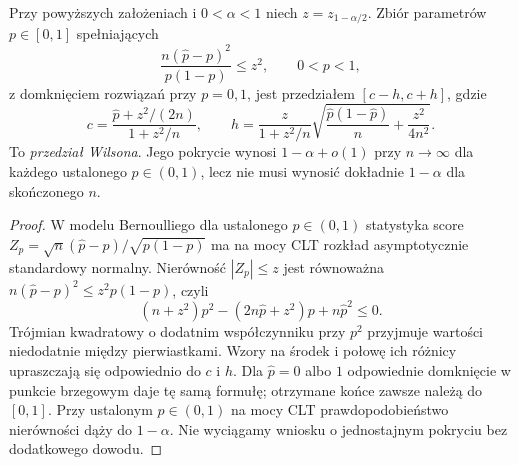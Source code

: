 \begin{twierdzenie}
\label{thm:wilson-ci}
Przy powyższych założeniach i $0<\alpha<1$ niech
$z=z_{1-\alpha/2}$. Zbiór parametrów $p\in[0,1]$
spełniających
\[
 \frac{n(\widehat p-p)^2}{p(1-p)}\le z^2,
 \qquad 0<p<1,
\]
z domknięciem rozwiązań przy $p=0,1$, jest przedziałem
$[c-h,c+h]$, gdzie
\[
 c=\frac{\widehat p+z^2/(2n)}{1+z^2/n},\qquad
 h=\frac{z}{1+z^2/n}\sqrt{
 \frac{\widehat p(1-\widehat p)}n+\frac{z^2}{4n^2}}.
\]
To \emph{przedział Wilsona}. Jego pokrycie wynosi
$1-\alpha+o(1)$ przy $n\to\infty$ dla każdego
ustalonego $p\in(0,1)$, lecz nie musi wynosić dokładnie
$1-\alpha$ dla skończonego $n$.
\end{twierdzenie}
\begin{proof}
W modelu Bernoulliego dla ustalonego $p\in(0,1)$
statystyka score $Z_p=\sqrt n(\widehat p-p)/\sqrt{p(1-p)}$
ma na mocy CLT rozkład asymptotycznie standardowy normalny.
Nierówność $|Z_p|\le z$ jest równoważna
$n(\widehat p-p)^2\le z^2p(1-p)$, czyli
\[
 (n+z^2)p^2-(2n\widehat p+z^2)p+n\widehat p^2\le0.
\]
Trójmian kwadratowy o dodatnim współczynniku przy $p^2$
przyjmuje wartości niedodatnie między pierwiastkami.
Wzory na środek i połowę ich różnicy upraszczają się
odpowiednio do $c$ i $h$. Dla $\widehat p=0$ albo $1$
odpowiednie domknięcie w punkcie brzegowym daje tę samą
formułę; otrzymane końce zawsze należą do $[0,1]$.
Przy ustalonym $p\in(0,1)$ na mocy CLT prawdopodobieństwo
nierówności dąży do $1-\alpha$. Nie wyciągamy wniosku
o jednostajnym pokryciu bez dodatkowego dowodu.
\end{proof}


